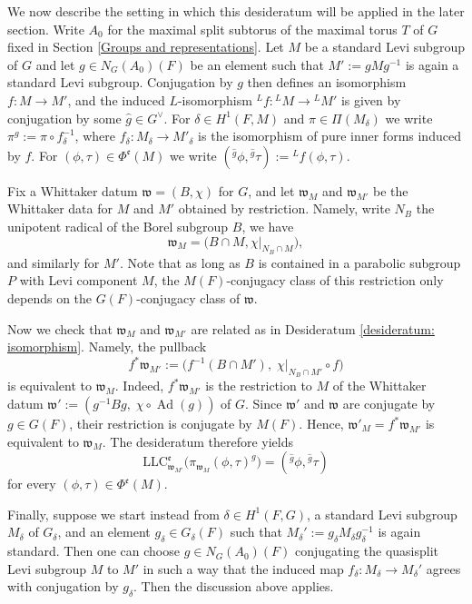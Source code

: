 \documentclass[11pt,letterpaper]{amsart}
\newcommand{\mfr}[1]{\mathfrak{#1}}
\newcommand{\LLC}{\mathrm{LLC}}
\DeclareMathOperator{\Ad}{Ad}
\renewcommand{\1}{\mathbbm{1}}
\numberwithin{equation}{section}
\begin{document}
{We now describe the setting in which this desideratum will be applied in the
later section. Write $A_0$ for the maximal split subtorus of the maximal torus
$T$ of $G$ fixed in Section \ref{Groups and representations}. Let $M$ be a
standard Levi subgroup of $G$ and let $g \in N_G(A_0)(F)$ be an element such
that $M' := g M g^{-1}$ is again a standard Levi subgroup. Conjugation by $g$
then defines an isomorphism $f \colon M \to M'$, and the induced
$L$-isomorphism ${}^L f \colon {}^L M \to {}^L M'$ is given by conjugation by
some $\widehat{g} \in G^{\vee}$. For $\delta \in H^1(F,M)$ and
$\pi \in \Pi(M_{\delta})$ we write $\pi^g := \pi \circ f_{\delta}^{-1}$, where
$f_{\delta} \colon M_{\delta} \to M'_{\delta}$ is the isomorphism of pure inner
forms induced by $f$. For $(\phi, \tau) \in \Phi^{\mfr{e}}(M)$ we write
$({}^{\widehat{g}}\phi, {}^{\widehat{g}}\tau) := {}^L f (\phi,\tau)$.

Fix a Whittaker datum $\mfr{w} = (B,\chi)$ for $G$, and let $\mfr{w}_{M}$ and
$\mfr{w}_{M'}$ be the Whittaker data for $M$ and $M'$ obtained by restriction. Namely, write $N_B$ the unipotent radical of the Borel subgroup $B$, we have
\[ \mfr{w}_M = \bigl( B \cap M , \chi|_{N_B \cap M} \bigr), \]
and similarly for $M'$. Note that as long as $B$ is contained in a parabolic subgroup $P$ with Levi component $M$, the $M(F)$-conjugacy class of this restriction only depends on the $G(F)$-conjugacy class of $\mfr{w}$.

Now we check that $\mfr{w}_M$ and $\mfr{w}_{M'}$ are
related as in Desideratum \ref{desideratum: isomorphism}. Namely, the
pullback
\[ f^{*}\mfr{w}_{M'} := \bigl( f^{-1}(B \cap M'),\;
   \chi|_{N_B \cap M'} \circ f \bigr) \]
is equivalent to $\mfr{w}_M$. Indeed, $f^{*}\mfr{w}_{M'}$ is the restriction to
$M$ of the Whittaker datum $\mfr{w}' := (g^{-1}Bg,\; \chi \circ \Ad(g))$ of
$G$. Since $\mfr{w}'$ and  $\mfr{w}$ are conjugate by
$g \in G(F)$, their restriction is conjugate by $M(F).$
Hence, $\mfr{w}'_M = f^{*}\mfr{w}_{M'}$ is equivalent to
$\mfr{w}_M$. The desideratum therefore yields
\[ \LLC^{\mfr{e}}_{\mfr{w}_{M'}}
   \bigl( \pi_{\mfr{w}_M}(\phi,\tau)^g \bigr)
   = ({}^{\widehat{g}} \phi, {}^{\widehat{g}} \tau) \]
for every $(\phi, \tau) \in \Phi^{\mfr{e}}(M)$.

Finally, suppose we start instead from $\delta \in H^1(F,G)$, a standard Levi
subgroup $M_{\delta}$ of $G_{\delta}$, and an element $g_{\delta} \in
G_{\delta}(F)$ such that $M_{\delta}' := g_{\delta} M_{\delta} g_{\delta}^{-1}$
is again standard. Then one can choose $g \in N_G(A_0)(F)$ conjugating the
quasisplit Levi subgroup $M$ to $M'$ in such a way that the induced map
$f_{\delta} \colon M_{\delta} \to M_{\delta}'$ agrees with conjugation by
$g_{\delta}$. Then the discussion above applies.


}
\end{document}
